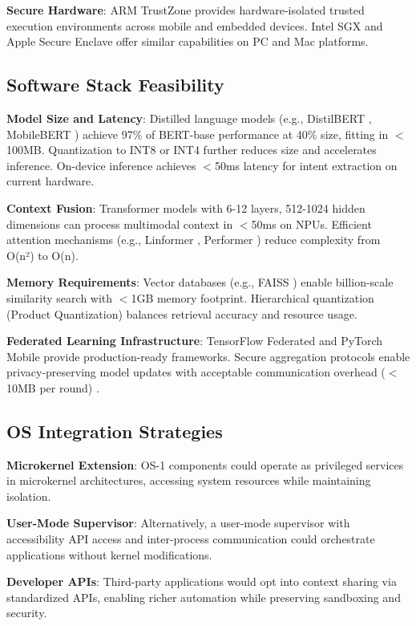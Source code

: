 \documentclass[conference]{IEEEtran}
\begin{document}
\textbf{Secure Hardware}: ARM TrustZone provides hardware-isolated trusted execution environments across mobile and embedded devices. Intel SGX and Apple Secure Enclave offer similar capabilities on PC and Mac platforms.

\subsection{Software Stack Feasibility}

\textbf{Model Size and Latency}: Distilled language models (e.g., DistilBERT \cite{sanh2019distilbert}, MobileBERT \cite{sun2020mobilebert}) achieve 97\% of BERT-base performance at 40\% size, fitting in $<$100MB. Quantization to INT8 or INT4 further reduces size and accelerates inference. On-device inference achieves $<$50ms latency for intent extraction on current hardware.

\textbf{Context Fusion}: Transformer models with 6-12 layers, 512-1024 hidden dimensions can process multimodal context in $<$50ms on NPUs. Efficient attention mechanisms (e.g., Linformer \cite{wang2020linformer}, Performer \cite{choromanski2020rethinking}) reduce complexity from O(n²) to O(n).

\textbf{Memory Requirements}: Vector databases (e.g., FAISS \cite{johnson2019billion}) enable billion-scale similarity search with $<$1GB memory footprint. Hierarchical quantization (Product Quantization) balances retrieval accuracy and resource usage.

\textbf{Federated Learning Infrastructure}: TensorFlow Federated and PyTorch Mobile provide production-ready frameworks. Secure aggregation protocols enable privacy-preserving model updates with acceptable communication overhead ($<$10MB per round) \cite{bonawitz2017practical}.

\subsection{OS Integration Strategies}

\textbf{Microkernel Extension}: OS-1 components could operate as privileged services in microkernel architectures, accessing system resources while maintaining isolation.

\textbf{User-Mode Supervisor}: Alternatively, a user-mode supervisor with accessibility API access and inter-process communication could orchestrate applications without kernel modifications.

\textbf{Developer APIs}: Third-party applications would opt into context sharing via standardized APIs, enabling richer automation while preserving sandboxing and security.
\end{document}
